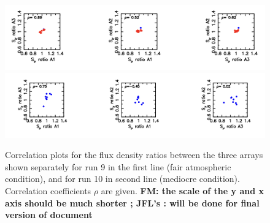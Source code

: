 \begin{figure}[p]
\begin{center}                                                                                                             
\includegraphics[clip, angle=0, scale=0.55]{Figures/Corr_r9.png}
  \includegraphics[clip, angle=0, scale=0.55]{Figures/Corr_r10.png}  
  \caption[Flux density correlation between arrays]{Correlation plots for the flux density ratios between  the three arrays
    shown separately for run 9 in the first line (fair atmospheric condition),  and for run 10 in second line (mediocre condition).
    Correlation coefficients $\rho$ are given. {\bf FM: the scale of
      the y and x axis should be much shorter ; JFL's : will be done for final
    version of document}}
\label{fig:U_N_corr}
\end{center}                                                                                                             
\end{figure}


